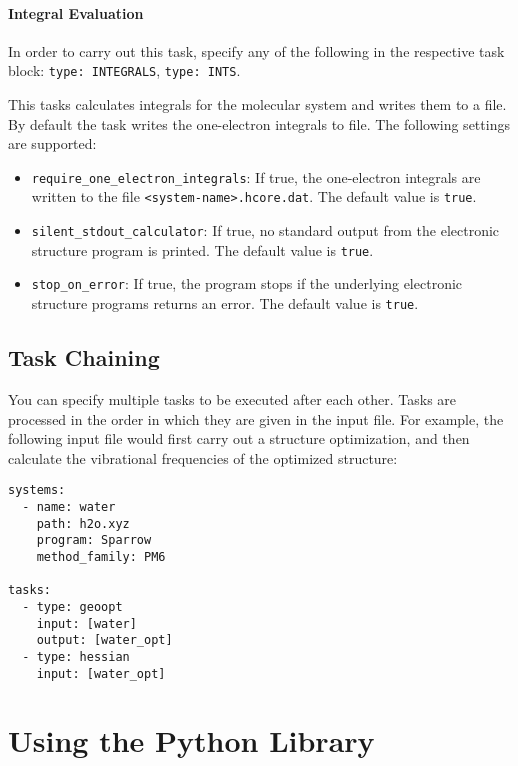 \documentclass[]{tufte-book}
\begin{document}
\subsubsection{Integral Evaluation}
In order to carry out this task, specify any of the following in the respective task block:
\texttt{type: INTEGRALS}, \texttt{type: INTS}.

This tasks calculates integrals for the molecular system and writes them to a file.
By default the task writes the one-electron integrals to file.
The following settings are supported:

\begin{itemize}
    \item \texttt{require\_one\_electron\_integrals}: If true, the one-electron integrals are written to the file \texttt{<system-name>.hcore.dat}. The default value is \texttt{true}.
    \item \texttt{silent\_stdout\_calculator}: If true, no standard output from the electronic structure program is printed. The default value is \texttt{true}.
    \item \texttt{stop\_on\_error}: If true, the program stops if the underlying electronic structure programs returns an error. The default value is \texttt{true}.
\end{itemize}

\section{Task Chaining}
\label{sec:task_chaining}

You can specify multiple tasks to be executed after each other. Tasks are processed in the order in which they are given in
the input file. For example, the following input file would first carry out a structure optimization, and then calculate
the vibrational frequencies of the optimized structure:

\begin{verbatim}
systems:
  - name: water
    path: h2o.xyz
    program: Sparrow
    method_family: PM6

tasks:
  - type: geoopt
    input: [water]
    output: [water_opt]
  - type: hessian
    input: [water_opt]
\end{verbatim}



\chapter{Using the Python Library}
\end{document}

